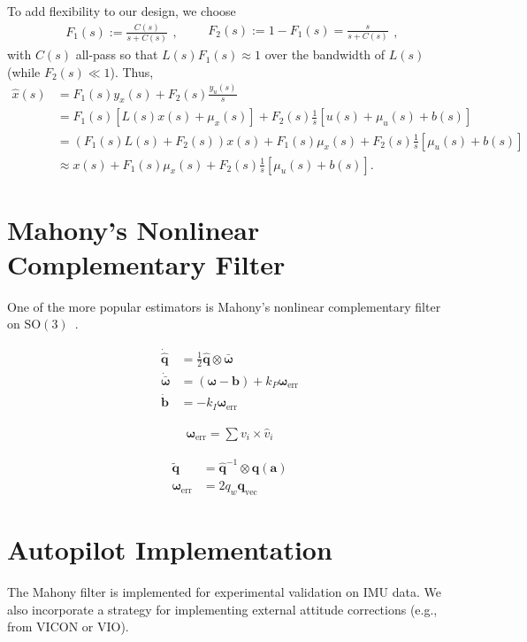\documentclass[a4paper]{article}
\begin{document}
To add flexibility to our design, we choose
\begin{equation}
\begin{split}
F_1(s) := \frac{C(s)}{s + C(s)}
\end{split},
\qquad
\begin{split}
F_2(s) := 1 - F_1(s) = \frac{s}{s + C(s)}
\end{split},
\end{equation}
with $C(s)$ all-pass so that $L(s)F_1(s)\approx1$ over the bandwidth of $L(s)$ (while $F_2(s)\ll1$).
Thus,
\begin{align}
\hat{x}(s) &= F_1(s)y_x(s) + F_2(s)\frac{y_u(s)}{s} \nonumber \\
           &= F_1(s)\left[L(s)x(s) + \mu_x(s)\right] + F_2(s)\frac{1}{s}\left[u(s) + \mu_u(s) + b(s)\right] \nonumber \\
           &= (F_1(s)L(s)+F_2(s))x(s) + F_1(s)\mu_x(s) + F_2(s)\frac{1}{s}\left[\mu_u(s) + b(s)\right] \nonumber \\
           &\approx x(s) + F_1(s)\mu_x(s) + F_2(s)\frac{1}{s}\left[\mu_u(s) + b(s)\right].
\end{align}

\section*{Mahony's Nonlinear Complementary Filter}
One of the more popular estimators is Mahony's nonlinear complementary filter on $\mathrm{SO}(3)$~\cite{Mahony2008}.

\begin{align}
  \dot{\bm{\hat{q}}} &= \frac{1}{2} \hat{\bm q} \otimes \bm{\bar \omega} \\
  \dot{\bm{\bar \omega}} &= (\bm{\omega} - \bm{b}) + k_P\bm{\omega}_\text{err} \\
  \dot{\bm{b}} &= -k_I\bm{\omega}_\text{err}
\end{align}

\begin{align}
  \bm{\omega}_\text{err} = \sum v_i \times \hat{v}_i
\end{align}

\begin{align}
  \tilde{\bm{q}} &= \hat{\bm q}^{-1} \otimes \bm{q}(\bm{a}) \\
  \bm{\omega}_\text{err} &= 2 q_w \bm{q}_\text{vec}
\end{align}

\section*{Autopilot Implementation}
The Mahony filter is implemented for experimental validation on IMU data.
We also incorporate a strategy for implementing external attitude corrections (e.g., from VICON or VIO).
\end{document}
